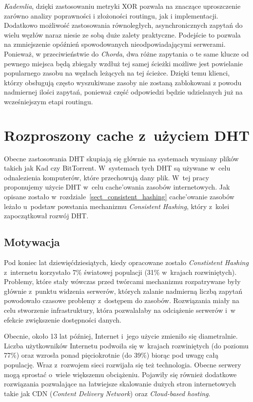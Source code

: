 \documentclass[a4paper,11pt]{scrartcl}
\newcommand{\s}{ }
\newcommand{\kesz}{cache}
\newcommand{\keszowania}{cache'owania}
\newcommand{\keszowanie}{cache'owanie}
\begin{document}
\textit{Kademlia}, dzięki zastosowaniu metryki XOR pozwala na znaczące uproszczenie zarówno analizy poprawności i złożoności routingu, jak i implementacji. Dodatkowo możliwość zastosowania równoległych, asynchronicznych zapytań do wielu węzłów naraz niesie ze sobą duże zalety praktyczne. Podejście to pozwala na zmniejszenie opóźnień spowodowanych nieodpowiadającymi serwerami. Ponieważ, w przeciwieństwie do \textit{Chorda}, dwa różne zapytania o te same klucze od pewnego miejsca będą zbiegały wzdłuż tej samej ścieżki możliwe jest powielanie popularnego zasobu na węzłach leżących na tej ścieżce. Dzięki temu klienci, którzy obsługują często wyszukiwane zasoby nie zostaną zablokowani z powodu nadmiernej ilości zapytań, ponieważ część odpowiedzi będzie udzielanych już na wcześniejszym etapi routingu.

\section{Rozproszony \kesz\s z~użyciem DHT}
\label{sect_cache_dht}
Obecne zastosowania DHT skupiają się głównie na systemach wymiany plików takich jak Kad czy BitTorrent. W~systemach tych DHT są używane w~celu odnalezienia komputerów, które przechowują dany plik. W~tej pracy proponujemy użycie DHT w~celu \keszowania\s zasobów internetowych. Jak opisane zostało w~rozdziale~\ref{sect_consistent_hashing} \keszowanie\s zasobów leżało u~podstaw powstania mechanizmu \textit{Consistent Hashing}, który z~kolei zapoczątkował rozwój DHT.

\subsection{Motywacja}
Pod koniec lat dziewięćdziesiątych, kiedy opracowane zostało \textit{Constistent Hashing} z~internetu korzystało 7\% światowej populacji (31\% w~krajach rozwiniętych)\cite{wiki:GlobalStats}. Problemy, które stały wówczas przed twórcami mechanizmu rozpatrywane były głównie z~punktu widzenia serwerów, których zalanie nadmierną liczbą zapytań powodowało czasowe problemy z~dostępem do zasobów. Rozwiązania miały na celu stworzenie infrastruktury, która pozwalałaby na odciążenie serwerów i~w efekcie zwiększenie dostępności danych.

Obecnie, około 13 lat później, Internet i~jego użycie zmieniło się diametralnie. Liczba użytkowników Internetu podwoiła się w~krajach rozwiniętych (do poziomu 77\%) oraz wzrosła ponad pięciokrotnie (do 39\%) biorąc pod uwagę całą populację\cite{wiki:GlobalStats}. Wraz z~rozwojem sieci rozwijała się też technologia. Obecne serwery mogą sprostać o~wiele większemu obciążeniu. Pojawiły się również dodatkowe rozwiązania pozwalające na łatwiejsze skalowanie dużych stron internetowych takie jak CDN (\textit{Content Delivery Network}) oraz \textit{Cloud-based hosting}.
\end{document}
